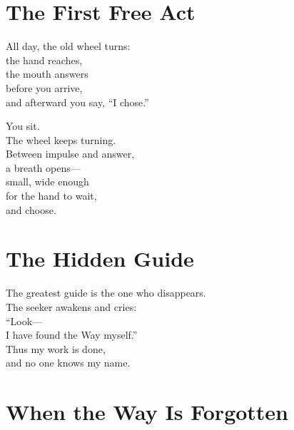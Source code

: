 \documentclass[10pt, openright]{book}
\newcommand{\sectionbreak}{\filbreak}
\newcommand{\sayingsource}[1]{\par\nopagebreak\vspace{0.3\baselineskip}{\raggedleft\footnotesize\itshape #1\par}}
\begin{document}
\sayingsource{Tao Te Ching 15, 16}

\sectionbreak

\section{The First Free Act}\label{the-first-free-act}

All day, the old wheel turns:\\
the hand reaches,\\
the mouth answers\\
before you arrive,\\
and afterward you say, ``I chose.''

You sit.\\
The wheel keeps turning.\\
Between impulse and answer,\\
a breath opens---\\
small, wide enough\\
for the hand to wait,\\
and choose.

\sayingsource{Tao Te Ching 16 · Philip · Thomas 6 · Bhagavad Gita 3.27 ·
Ashtavakra Gita 1.8, 18.20}

\sectionbreak

\section{The Hidden Guide}\label{the-hidden-guide}

The greatest guide is the one who disappears.\\
The seeker awakens and cries:\\
``Look---\\
I have found the Way myself.''\\
Thus my work is done,\\
and no one knows my name.

\sayingsource{Tao Te Ching 17}

\sectionbreak

\section{When the Way Is Forgotten}\label{when-the-way-is-forgotten}
\end{document}
